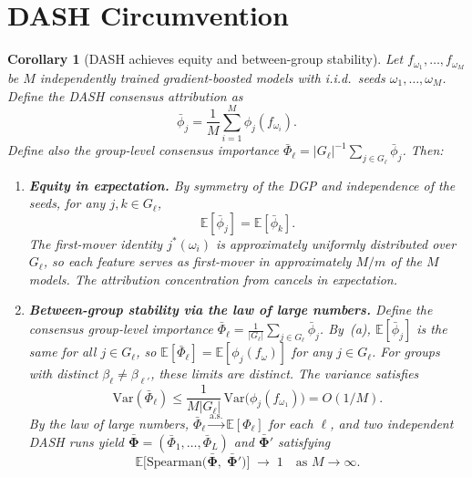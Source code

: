 \documentclass[11pt]{article}
\newtheorem{corollary}[theorem]{Corollary}
\theoremstyle{remark}
\newcommand{\Gl}{G_\ell}                    %
\newcommand{\phij}{\phi_j}                  %
\newcommand{\Exp}{\mathbb{E}}              %
\newcommand{\Var}{\mathrm{Var}}            %
\newcommand{\dash}{\textsc{DASH}}
\begin{document}
\section{DASH Circumvention}
\label{sec:circumvention}

\begin{corollary}[\dash{} achieves equity and between-group stability]
\label{cor:dash}
Let $f_{\omega_1}, \dots, f_{\omega_M}$ be $M$ independently trained
gradient-boosted models with i.i.d.\ seeds $\omega_1, \dots, \omega_M$.
Define the \dash{} consensus attribution as
\begin{equation}
  \bar{\phi}_j = \frac{1}{M} \sum_{i=1}^{M} \phij(f_{\omega_i}).
\end{equation}
Define also the group-level consensus importance
$\bar\Phi_\ell = |G_\ell|^{-1}\sum_{j\in G_\ell}\bar\phi_j$.
Then:
\begin{enumerate}
  \item[(a)] \textbf{Equity in expectation.} By symmetry of the DGP and
    independence of the seeds, for any $j, k \in \Gl$,
    \begin{equation}
      \Exp[\bar{\phi}_j] = \Exp[\bar{\phi}_k].
    \end{equation}
    The first-mover identity $j^*(\omega_i)$ is approximately uniformly
    distributed over $\Gl$, so each feature serves as first-mover in
    approximately $M/m$ of the $M$ models.  The attribution concentration
    from  cancels in expectation.

  \item[(b)] \textbf{Between-group stability via the law of large numbers.}
    Define the consensus group-level importance
    $\bar\Phi_\ell = \frac{1}{|G_\ell|}\sum_{j\in G_\ell}\bar\phi_j$.
    By~(a), $\Exp[\bar\phi_j]$ is the same for all $j\in G_\ell$,
    so $\Exp[\bar\Phi_\ell] = \Exp[\phi_j(f_\omega)]$ for any
    $j\in G_\ell$.  For groups with distinct $\beta_\ell \neq \beta_{\ell'}$,
    these limits are distinct.  The variance satisfies
    \begin{equation}
      \Var(\bar\Phi_\ell) \leq
        \frac{1}{M|G_\ell|}\,\Var\bigl(\phi_j(f_{\omega_1})\bigr)
        = O(1/M).
    \end{equation}
    By the law of large numbers,
    $\bar\Phi_\ell \xrightarrow{\mathrm{a.s.}} \Exp[\Phi_\ell]$
    for each $\ell$, and two independent \dash{} runs yield
    $\bar{\boldsymbol{\Phi}} = (\bar\Phi_1,\ldots,\bar\Phi_L)$ and
    $\bar{\boldsymbol{\Phi}}'$ satisfying
    \begin{equation}
      \Exp\bigl[\mathrm{Spearman}\bigl(
        \bar{\boldsymbol{\Phi}},\;\bar{\boldsymbol{\Phi}}'
      \bigr)\bigr] \;\to\; 1
      \quad \text{as } M \to \infty.
    \end{equation}


\end{enumerate}
\end{corollary}
\end{document}
